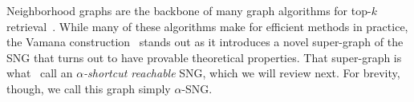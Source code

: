 \medskip

Neighborhood graphs are the backbone of many graph algorithms for top-$k$
retrieval~\citep{nsw2014,hnsw2020,fanng2016,fu2019nsg,fu2022nssg,diskann}.
While many of these algorithms make for efficient methods in practice, the
Vamana construction~\citep{diskann} stands out as it introduces a novel
super-graph of the SNG that turns out to have provable theoretical properties.
That super-graph is what~\cite{indyk2023worstcase}
call an \emph{$\alpha$-shortcut reachable} SNG, which we will review next.
For brevity, though, we call this graph simply $\alpha$-SNG.

\begin{figure}[t]
    \centering
    

\end{figure}
